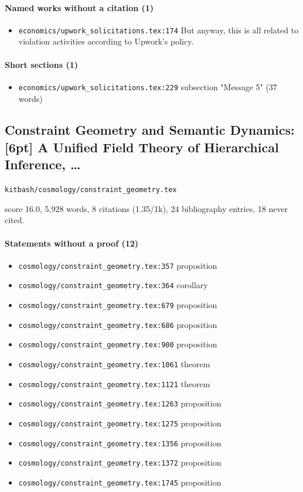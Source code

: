 \documentclass[11pt]{article}
\newcommand{\loc}[1]{{\small\color{muted}\texttt{#1}}}
\begin{document}
\paragraph{Named works without a citation (1)}
\begin{itemize}
\item \loc{economics/\allowbreak{}upwork\_solicitations.tex:174} But anyway, this is all related to violation activities according to Upwork's policy.
\end{itemize}
\paragraph{Short sections (1)}
\begin{itemize}
\item \loc{economics/\allowbreak{}upwork\_solicitations.tex:229} subsection "Message 5" (37 words)
\end{itemize}
\subsection{Constraint Geometry and Semantic Dynamics: [6pt] A Unified Field Theory of Hierarchical Inference, \ldots{}}
\loc{kitbash/\allowbreak{}cosmology/\allowbreak{}constraint\_geometry.tex}\par
score 16.0, 5,928 words, 8 citations (1.35/1k), 24 bibliography entries, 18 never cited.

\paragraph{Statements without a proof (12)}
\begin{itemize}
\item \loc{cosmology/\allowbreak{}constraint\_geometry.tex:357} proposition
\item \loc{cosmology/\allowbreak{}constraint\_geometry.tex:364} corollary
\item \loc{cosmology/\allowbreak{}constraint\_geometry.tex:679} proposition
\item \loc{cosmology/\allowbreak{}constraint\_geometry.tex:686} proposition
\item \loc{cosmology/\allowbreak{}constraint\_geometry.tex:900} proposition
\item \loc{cosmology/\allowbreak{}constraint\_geometry.tex:1061} theorem
\item \loc{cosmology/\allowbreak{}constraint\_geometry.tex:1121} theorem
\item \loc{cosmology/\allowbreak{}constraint\_geometry.tex:1263} proposition
\item \loc{cosmology/\allowbreak{}constraint\_geometry.tex:1275} proposition
\item \loc{cosmology/\allowbreak{}constraint\_geometry.tex:1356} proposition
\item \loc{cosmology/\allowbreak{}constraint\_geometry.tex:1372} proposition
\item \loc{cosmology/\allowbreak{}constraint\_geometry.tex:1745} proposition
\end{itemize}
\end{document}
